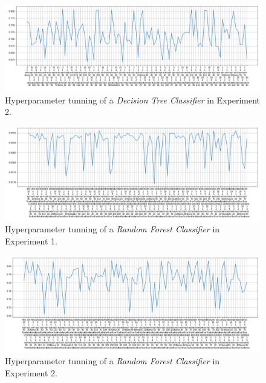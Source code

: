 \documentclass[sigplan,screen]{acmart}
\begin{document}
\begin{figure}[h]
    \centering
    \includegraphics[width=\linewidth]{reports/figures/decision_tree_2.png}
    \caption{Hyperparameter tunning of a \emph{Decision Tree Classifier} in Experiment 2.}
    \label{fig:hyp_decision_2}
\end{figure}

\begin{figure}[h]
    \centering
    \includegraphics[width=\linewidth]{reports/figures/random_forest_1.png}
    \caption{Hyperparameter tunning of a \emph{Random Forest Classifier} in Experiment 1.}
    \label{fig:hyp_forest_1}
\end{figure}

\begin{figure}[h]
    \centering
    \includegraphics[width=\linewidth]{reports/figures/random_forest_2.png}
    \caption{Hyperparameter tunning of a \emph{Random Forest Classifier} in Experiment 2.}
    \label{fig:hyp_forest_2}
\end{figure}
\end{document}
